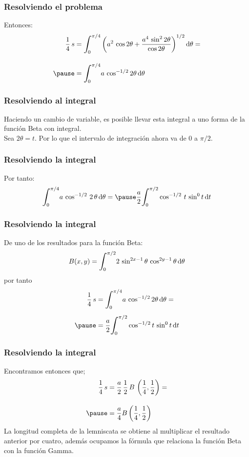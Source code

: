 \documentclass[12pt]{beamer}
\begin{document}
\begin{frame}
\frametitle{Resolviendo el problema}
Entonces:
\begin{eqnarray*}
\begin{aligned}
\dfrac{1}{4} \, s &= \scaleint{6ex}_{\bs {0}}^{\pi/4} \left( a^{2} \, \cos 2 \theta + \dfrac{a^{4} \, \sin^{2} 2 \theta}{\cos 2 \theta} \right)^{1/2} \dd{\theta} = \\[1em] \pause
&= \scaleint{6ex}_{\bs {0}}^{\pi/4} a \, \cos^{-1/2} 2 \theta \dd{\theta}
\end{aligned}
\end{eqnarray*}
\end{frame}
\begin{frame}
\frametitle{Resolviendo al integral}
Haciendo un cambio de variable, es posible llevar esta integral a uno forma de la función Beta con integral.
\\
\bigskip
\pause
Sea $2 \theta = t$. Por lo que el intervalo de integración ahora va de $0$ a $\pi/2$.
\end{frame}
\begin{frame}
\frametitle{Resolviendo la integral}
Por tanto:
\begin{eqnarray*}
\begin{aligned}
\scaleint{6ex}_{\bs 0}^{\pi/4} a \, \cos^{-1/2} \, 2 \, \theta \dd{\theta} = \pause \dfrac{a}{2} \scaleint{6ex}_{\bs {0}}^{\pi/2} \cos^{-1/2} \, t \, \sin^{0} t \dd{t}
\end{aligned}
\end{eqnarray*}
\end{frame}
\begin{frame}
\frametitle{Resolviendo la integral}
De uno de los resultados para la función Beta:
\begin{align*}
B(x, y) = \scaleint{6ex}_{\bs {0}}^{\pi/2} 2 \, \sin^{2x-1} \theta \, \cos^{2y-1} \theta \dd{\theta}
\end{align*}
\pause
por tanto
\begin{eqnarray*}
\begin{aligned}
\dfrac{1}{4} \, s &= \scaleint{6ex}_{\bs {0}}^{\pi/4} a \, \cos^{-1/2} 2 \theta \dd{\theta} =  \\[0.5em] \pause
&= \dfrac{a}{2} \scaleint{6ex}_{\bs {0}}^{\pi/2} \cos^{-1/2} t \, \sin^{0} t \dd{t}
\end{aligned}
\end{eqnarray*}
\end{frame}
\begin{frame}
\frametitle{Resolviendo la integral}
Encontramos entonces que;
\begin{eqnarray*}
\begin{aligned}
\dfrac{1}{4} \, s &= \dfrac{a}{2} \, \dfrac{1}{2} \, B \, \left(\dfrac{1}{4}, \dfrac{1}{2} \right) = \\[1em] \pause
&= \dfrac{a}{4} B\left(\dfrac{1}{4}, \dfrac{1}{2} \right)
\end{aligned}
\end{eqnarray*}
\pause
\fontsize{12}{12}\selectfont
La longitud completa de la lemniscata se obtiene al multiplicar el resultado anterior por cuatro, además ocupamos la fórmula que relaciona la función Beta con la función Gamma.
\end{frame}
\end{document}
